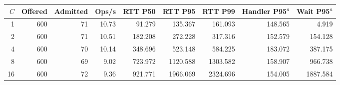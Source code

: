 \begin{tabular}{@{}rrrrrrrrr@{}}
\toprule
$C$ & Offered & Admitted & Ops/s & RTT P50 & RTT P95 & RTT P99 & Handler P95$^a$ & Wait P95$^a$ \\
\midrule
1 & 600 & 71 & 10.73 & 91.279 & 135.367 & 161.093 & 148.565 & 4.919 \\
2 & 600 & 71 & 10.51 & 182.208 & 272.228 & 317.316 & 152.579 & 154.128 \\
4 & 600 & 70 & 10.14 & 348.696 & 523.148 & 584.225 & 183.072 & 387.175 \\
8 & 600 & 69 & 9.02 & 723.972 & 1120.588 & 1303.582 & 158.907 & 966.738 \\
16 & 600 & 72 & 9.36 & 921.771 & 1966.069 & 2324.696 & 154.005 & 1887.584 \\
\bottomrule
\end{tabular}
